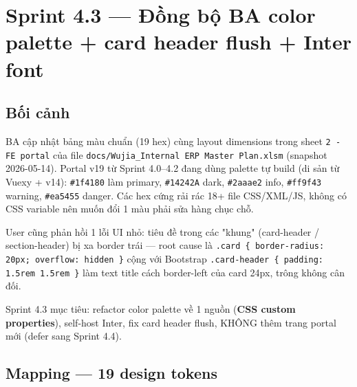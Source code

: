 \chapter{Sprint 4.3 --- Đồng bộ BA color palette + card header flush + Inter font}

\section{Bối cảnh}

BA cập nhật bảng màu chuẩn (19 hex) cùng layout dimensions trong sheet \texttt{2 - FE portal} của file \texttt{docs/Wujia\_Internal ERP Master Plan.xlsm} (snapshot 2026-05-14). Portal v19 từ Sprint 4.0--4.2 đang dùng palette tự build (di sản từ Vuexy + v14): \texttt{\#1f4180} làm primary, \texttt{\#14242A} dark, \texttt{\#2aaae2} info, \texttt{\#ff9f43} warning, \texttt{\#ea5455} danger. Các hex cứng rải rác 18+ file CSS/XML/JS, không có CSS variable nên muốn đổi 1 màu phải sửa hàng chục chỗ.

User cũng phản hồi 1 lỗi UI nhỏ: tiêu đề trong các "khung" (card-header / section-header) bị xa border trái --- root cause là \texttt{.card \{ border-radius: 20px; overflow: hidden \}} cộng với Bootstrap \texttt{.card-header \{ padding: 1.5rem 1.5rem \}} làm text title cách border-left của card 24px, trông không cân đối.

Sprint 4.3 mục tiêu: refactor color palette về 1 nguồn (\textbf{CSS custom properties}), self-host Inter, fix card header flush, KHÔNG thêm trang portal mới (defer sang Sprint 4.4).

\section{Mapping --- 19 design tokens}

